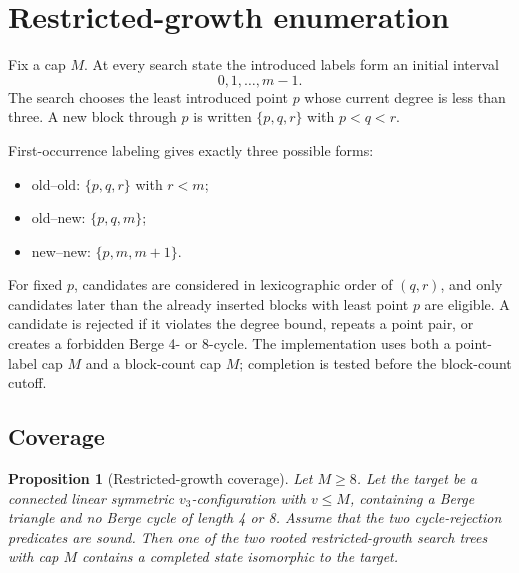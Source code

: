 \documentclass[11pt]{article}
\newtheorem{proposition}[theorem]{Proposition}
\theoremstyle{remark}
\newcommand{\vthree}{v_3}
\begin{document}
\section{Restricted-growth enumeration}\label{sec:enumeration}

Fix a cap \(M\).  At every search state the introduced labels form an initial interval
\[
0,1,\ldots,m-1.
\]
The search chooses the least introduced point \(p\) whose current degree is less than three.  A new block through \(p\) is written \(\{p,q,r\}\) with \(p<q<r\).

First-occurrence labeling gives exactly three possible forms:
\begin{itemize}
\item old--old: \(\{p,q,r\}\) with \(r<m\);
\item old--new: \(\{p,q,m\}\);
\item new--new: \(\{p,m,m+1\}\).
\end{itemize}
For fixed \(p\), candidates are considered in lexicographic order of \((q,r)\), and only candidates later than the already inserted blocks with least point \(p\) are eligible.  A candidate is rejected if it violates the degree bound, repeats a point pair, or creates a forbidden Berge 4- or 8-cycle.  The implementation uses both a point-label cap \(M\) and a block-count cap \(M\); completion is tested before the block-count cutoff.

\subsection{Coverage}

\begin{proposition}[Restricted-growth coverage]\label{prop:coverage}
Let \(M\ge 8\).  Let the target be a connected linear symmetric \(\vthree\)-configuration with \(v\le M\), containing a Berge triangle and no Berge cycle of length 4 or 8.  Assume that the two cycle-rejection predicates are sound.  Then one of the two rooted restricted-growth search trees with cap \(M\) contains a completed state isomorphic to the target.
\end{proposition}
\end{document}
